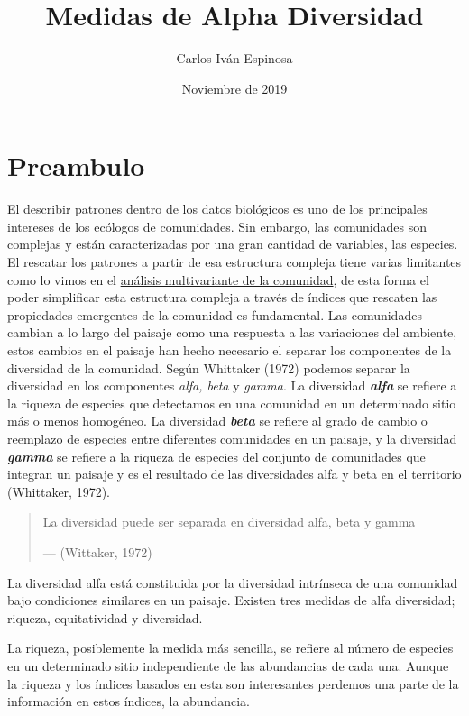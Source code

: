 \documentclass[]{book}
\title{Medidas de Alpha Diversidad}
\author{Carlos Iván Espinosa}
\date{Noviembre de 2019}
\begin{document}
\maketitle

{
\setcounter{tocdepth}{1}
\tableofcontents
}
\chapter*{Preambulo}\label{preambulo}

El describir patrones dentro de los datos biológicos es uno de los
principales intereses de los ecólogos de comunidades. Sin embargo, las
comunidades son complejas y están caracterizadas por una gran cantidad
de variables, las especies. El rescatar los patrones a partir de esa
estructura compleja tiene varias limitantes como lo vimos en el
\href{https://ciespinosa.github.io/AnalisisMultivariante/index.html}{análisis
multivariante de la comunidad}, de esta forma el poder simplificar esta
estructura compleja a través de índices que rescaten las propiedades
emergentes de la comunidad es fundamental. Las comunidades cambian a lo
largo del paisaje como una respuesta a las variaciones del ambiente,
estos cambios en el paisaje han hecho necesario el separar los
componentes de la diversidad de la comunidad. Según Whittaker (1972)
podemos separar la diversidad en los componentes \emph{alfa, beta} y
\emph{gamma}. La diversidad \emph{\textbf{alfa}} se refiere a la riqueza
de especies que detectamos en una comunidad en un determinado sitio más
o menos homogéneo. La diversidad \emph{\textbf{beta}} se refiere al
grado de cambio o reemplazo de especies entre diferentes comunidades en
un paisaje, y la diversidad \emph{\textbf{gamma}} se refiere a la
riqueza de especies del conjunto de comunidades que integran un paisaje
y es el resultado de las diversidades alfa y beta en el territorio
(Whittaker, 1972).

\begin{quote}
La diversidad puede ser separada en diversidad alfa, beta y gamma

--- (Wittaker, 1972)
\end{quote}

La diversidad alfa está constituida por la diversidad intrínseca de una
comunidad bajo condiciones similares en un paisaje. Existen tres medidas
de alfa diversidad; riqueza, equitatividad y diversidad.

La riqueza, posiblemente la medida más sencilla, se refiere al número de
especies en un determinado sitio independiente de las abundancias de
cada una. Aunque la riqueza y los índices basados en esta son
interesantes perdemos una parte de la información en estos índices, la
abundancia.
\end{document}
